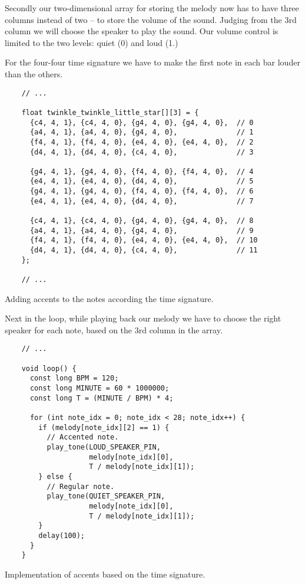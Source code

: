 \documentclass[../sparc.tex]{subfiles}
\begin{document}
Secondly our two-dimensional array for storing the melody now has to have three
columns instead of two -- to store the volume of the sound.  Judging from the 3rd
column we will choose the speaker to play the sound.  Our volume control is
limited to the two levels: quiet (0) and loud (1.)

For the four-four time signature we have to make the first note in each bar
louder than the others.

\begin{listing}[!h]
  \begin{verbatim}
    // ...

    float twinkle_twinkle_little_star[][3] = {
      {c4, 4, 1}, {c4, 4, 0}, {g4, 4, 0}, {g4, 4, 0},  // 0
      {a4, 4, 1}, {a4, 4, 0}, {g4, 4, 0},              // 1
      {f4, 4, 1}, {f4, 4, 0}, {e4, 4, 0}, {e4, 4, 0},  // 2
      {d4, 4, 1}, {d4, 4, 0}, {c4, 4, 0},              // 3

      {g4, 4, 1}, {g4, 4, 0}, {f4, 4, 0}, {f4, 4, 0},  // 4
      {e4, 4, 1}, {e4, 4, 0}, {d4, 4, 0},              // 5
      {g4, 4, 1}, {g4, 4, 0}, {f4, 4, 0}, {f4, 4, 0},  // 6
      {e4, 4, 1}, {e4, 4, 0}, {d4, 4, 0},              // 7

      {c4, 4, 1}, {c4, 4, 0}, {g4, 4, 0}, {g4, 4, 0},  // 8
      {a4, 4, 1}, {a4, 4, 0}, {g4, 4, 0},              // 9
      {f4, 4, 1}, {f4, 4, 0}, {e4, 4, 0}, {e4, 4, 0},  // 10
      {d4, 4, 1}, {d4, 4, 0}, {c4, 4, 0},              // 11
    };

    // ...
  \end{verbatim}
  \label{listing:adding-musical-scale-to-array}
  \caption{Adding accents to the notes according the time signature.}
\end{listing}

Next in the loop, while playing back our melody we have to choose the right
speaker for each note, based on the 3rd column in the array.

\begin{listing}[h]
  \begin{verbatim}
    // ...

    void loop() {
      const long BPM = 120;
      const long MINUTE = 60 * 1000000;
      const long T = (MINUTE / BPM) * 4;

      for (int note_idx = 0; note_idx < 28; note_idx++) {
        if (melody[note_idx][2] == 1) {
          // Accented note.
          play_tone(LOUD_SPEAKER_PIN,
                    melody[note_idx][0],
                    T / melody[note_idx][1]);
        } else {
          // Regular note.
          play_tone(QUIET_SPEAKER_PIN,
                    melody[note_idx][0],
                    T / melody[note_idx][1]);
        }
        delay(100);
      }
    }
  \end{verbatim}
  \label{listing:musical-scale-implementation}
  \caption{Implementation of accents based on the time signature.}
\end{listing}
\end{document}
